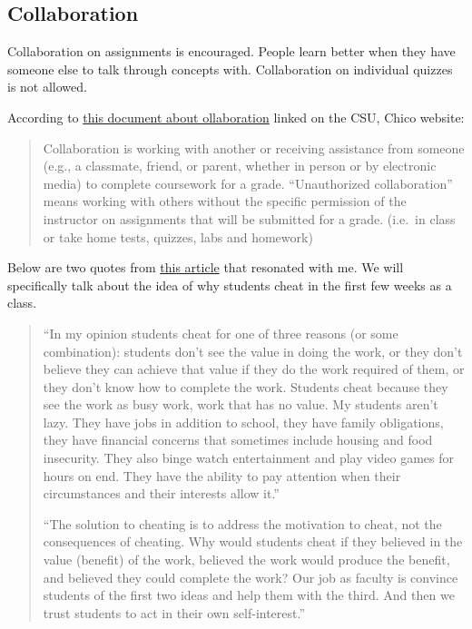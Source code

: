 \documentclass[
]{article}
\begin{document}
\hypertarget{collaboration}{%
\subsection{Collaboration}\label{collaboration}}

Collaboration on assignments is encouraged. People learn better when
they have someone else to talk through concepts with. Collaboration on
individual quizzes is not allowed.

According to
\href{https://www.csuchico.edu/scrr/_assets/documents/collaboration.pdf}{this
document about ollaboration} linked on the CSU, Chico website:

\begin{quote}
Collaboration is working with another or receiving assistance from
someone (e.g., a classmate, friend, or parent, whether in person or by
electronic media) to complete coursework for a grade. ``Unauthorized
collaboration'' means working with others without the specific
permission of the instructor on assignments that will be submitted for a
grade. (i.e.~in class or take home tests, quizzes, labs and homework)
\end{quote}

Below are two quotes from
\href{https://revoteaching.blogspot.com/2021/04/ungrading-and-academic-integrity.html}{this
article} that resonated with me. We will specifically talk about the
idea of why students cheat in the first few weeks as a class.

\begin{quote}
``In my opinion students cheat for one of three reasons (or some
combination): students don't see the value in doing the work, or they
don't believe they can achieve that value if they do the work required
of them, or they don't know how to complete the work. Students cheat
because they see the work as busy work, work that has no value. My
students aren't lazy. They have jobs in addition to school, they have
family obligations, they have financial concerns that sometimes include
housing and food insecurity. They also binge watch entertainment and
play video games for hours on end. They have the ability to pay
attention when their circumstances and their interests allow it.''

``The solution to cheating is to address the motivation to cheat, not
the consequences of cheating. Why would students cheat if they believed
in the value (benefit) of the work, believed the work would produce the
benefit, and believed they could complete the work? Our job as faculty
is convince students of the first two ideas and help them with the
third. And then we trust students to act in their own self-interest.''
\end{quote}
\end{document}
